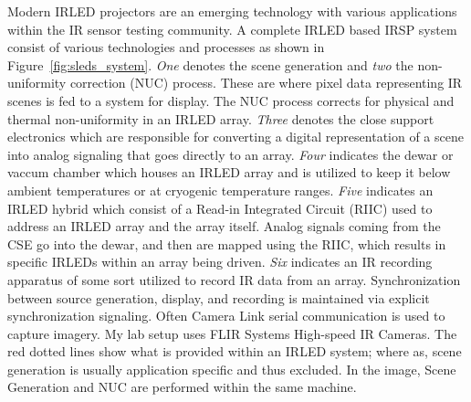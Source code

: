     Modern IRLED projectors are an emerging technology with various applications within the IR sensor testing community. A complete IRLED based IRSP system consist of various technologies and processes as shown in Figure~\ref{fig:sleds_system}. \emph{One} denotes the scene generation and \emph{two} the non-uniformity correction (NUC) process. These are where pixel data representing IR scenes is fed to a system for display. The NUC process corrects for physical and thermal non-uniformity\cite{BarakhshanEtAl2017} in an IRLED array\cite{BarakhshanEtAl2018}. \emph{Three} denotes the close support electronics\cite{ejzak4} which are responsible for converting a digital representation of a scene into analog signaling that goes directly to an array. \emph{Four} indicates the dewar\cite{lang1, MarksEtAl2017} or vaccum chamber which houses an IRLED array and is utilized to keep it below ambient temperatures or at cryogenic temperature ranges. \emph{Five} indicates an IRLED hybrid which consist of a Read-in Integrated Circuit (RIIC)\cite{HernandezEtAl2017} used to address an IRLED array and the array itself. Analog signals coming from the CSE go into the dewar, and then are mapped using the RIIC, which results in specific IRLEDs within an array being driven. \emph{Six} indicates an IR recording apparatus of some sort utilized to record IR data from an array. Synchronization between source generation, display, and recording is maintained via explicit synchronization signaling. Often Camera Link serial communication\cite{CameraLink2000, zhu2008design} is used to capture imagery. My lab setup uses FLIR Systems High-speed IR Cameras\cite{FLIR1, FLIR2}. The red dotted lines show what is provided within an IRLED system; where as, scene generation is usually application specific and thus excluded. In the image, Scene Generation and NUC are performed within the same machine.

